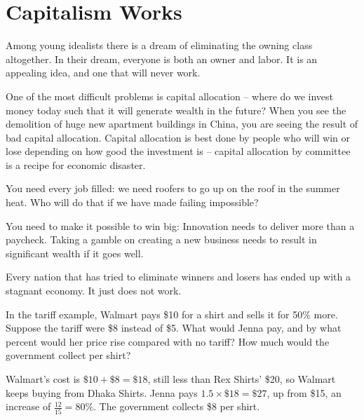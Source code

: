 \section{Capitalism Works}

Among young idealists there is a dream of eliminating the owning class altogether. In their dream, everyone is both an owner and labor. It is an appealing idea, and one that will never work.

One of the most difficult problems is capital allocation -- where do we invest money today such that it will generate wealth in the future? When you see the demolition of huge new apartment buildings in China, you are seeing the result of bad capital allocation.  Capital allocation is best done by people who will win or lose depending on how good the investment is -- capital allocation by committee is a recipe for economic disaster.

You need every job filled: we need roofers to go up on the roof in the summer heat. Who will do that if we have made failing impossible?

You need to make it possible to win big: Innovation needs to deliver more than a paycheck. Taking a gamble on creating a new business needs to result in significant wealth if it goes well.

Every nation that has tried to eliminate winners and losers has ended up with a stagnant economy. It just does not work.

\begin{Exercise}[title={Tariff and Price}, label=econ1]
In the tariff example, Walmart pays \$10 for a shirt and sells it for
50\% more. Suppose the tariff were \$8 instead of \$5. What would Jenna pay,
and by what percent would her price rise compared with no tariff? How much
would the government collect per shirt?
\end{Exercise}
\begin{Answer}[ref=econ1]
Walmart's cost is $\$10 + \$8 = \$18$, still less than Rex Shirts' \$20,
so Walmart keeps buying from Dhaka Shirts. Jenna pays
$1.5 \times \$18 = \$27$, up from \$15, an increase of
$\frac{12}{15} = 80\%$. The government collects \$8 per shirt.
\end{Answer}
